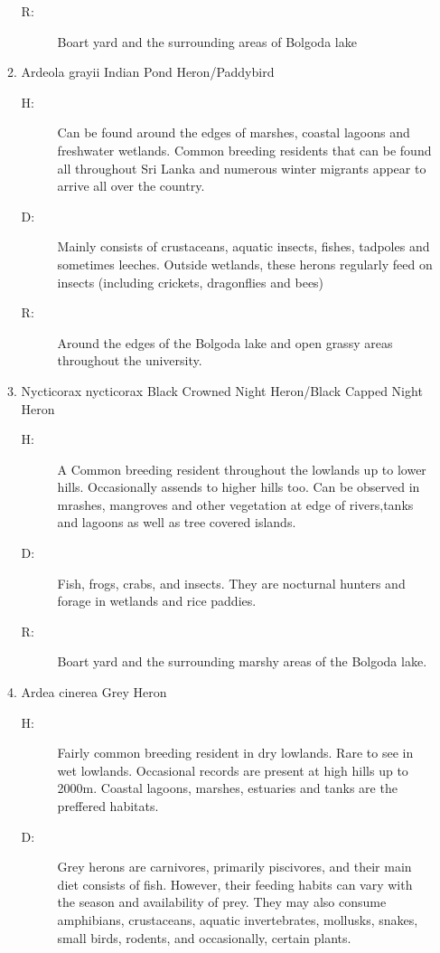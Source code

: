 \begin{itemize}
\begin{enumerate}
\begin{description}
\item[R: ]%
Boart yard and the surrounding areas of Bolgoda lake%
\end{description}%
\item%
Ardeola grayii\newline%
Indian Pond Heron/Paddybird%
\begin{description}%
\item[H: ]%
Can be found around the edges of marshes, coastal lagoons and freshwater wetlands. Common breeding residents that can be found all throughout Sri Lanka and numerous winter migrants appear to arrive all over the country. %
\item[D: ]%
Mainly consists of crustaceans, aquatic insects, fishes, tadpoles and sometimes leeches. Outside wetlands, these herons regularly feed on insects (including crickets, dragonflies and bees)%
\item[R: ]%
Around the edges of the Bolgoda lake and open grassy areas throughout the university.%
\end{description}%
\item%
Nycticorax nycticorax\newline%
Black Crowned Night Heron/Black Capped Night Heron%
\begin{description}%
\item[H: ]%
A Common breeding resident throughout the lowlands  up to lower hills. Occasionally assends to higher hills too. Can be observed in mrashes, mangroves and other vegetation at edge of rivers,tanks and lagoons as well as tree covered islands.%
\item[D: ]%
Fish, frogs, crabs, and insects. They are nocturnal hunters and forage in wetlands and rice paddies.%
\item[R: ]%
Boart yard and the surrounding marshy areas of the Bolgoda lake. %
\end{description}%
\item%
Ardea cinerea\newline%
Grey Heron%
\begin{description}%
\item[H: ]%
Fairly common breeding resident in dry lowlands. Rare to see in wet lowlands. Occasional records are present at high hills up to 2000m. Coastal lagoons, marshes, estuaries and tanks are the preffered habitats.%
\item[D: ]%
Grey herons are carnivores, primarily piscivores, and their main diet consists of fish. However, their feeding habits can vary with the season and availability of prey. They may also consume amphibians, crustaceans, aquatic invertebrates, mollusks, snakes, small birds, rodents, and occasionally, certain plants.%

\end{description}
\end{enumerate}
\end{itemize}
